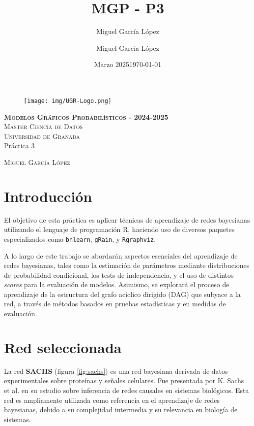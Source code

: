 \documentclass[12pt,letterpaper]{article}
\title{MGP - P3}
\author{Miguel García López}
\date{Marzo 2025}
\author{Miguel García López} %
\date{\normalsize\today} %
\begin{document}
\begin{titlepage}
    \begin{figure}
        \vspace{-1.3cm}
        \begin{center}
            \texttt{[image: img/UGR-Logo.png]}
        \end{center}
    \end{figure}
    \vspace{1.3cm}
    \centering
    \normalfont \normalsize
    \textsc{\textbf{Modelos Gráficos Probabilísticos - 2024-2025} \\ \vspace{.15cm} Master Ciencia de Datos\\ \vspace{.15cm} Universidad de Granada} \\ [25pt]
    \huge Práctica 3

    \normalfont \normalsize \vspace{.30cm}
    \textsc{Miguel García López}

\end{titlepage}

\tableofcontents
\listoffigures
\listoftables
\newpage

\section{Introducción}
El objetivo de esta práctica es aplicar técnicas de aprendizaje de redes bayesianas utilizando el lenguaje de programación R, haciendo uso de diversos paquetes especializados como \texttt{bnlearn}, \texttt{gRain}, y \texttt{Rgraphviz}.

A lo largo de este trabajo se abordarán aspectos esenciales del aprendizaje de redes bayesianas, tales como la estimación de parámetros mediante distribuciones de probabilidad condicional, los tests de independencia, y el uso de distintos \textit{scores} para la evaluación de modelos. Asimismo, se explorará el proceso de aprendizaje de la estructura del grafo acíclico dirigido (DAG) que subyace a la red, a través de métodos basados en pruebas estadísticas y en medidas de evaluación.

\section{Red seleccionada}
La red \textbf{SACHS} (figura \ref{fig:sachs}) es una red bayesiana derivada de datos experimentales sobre proteínas y señales celulares. Fue presentada por K. Sachs et al. en su estudio sobre inferencia de redes causales en sistemas biológicos. Esta red es ampliamente utilizada como referencia en el aprendizaje de redes bayesianas, debido a su complejidad intermedia y su relevancia en biología de sistemas.
\end{document}
